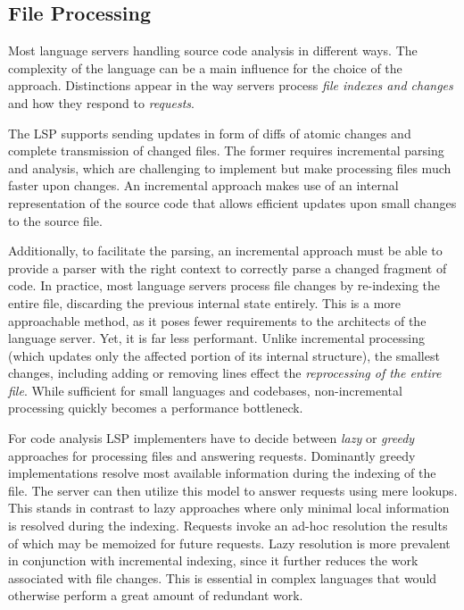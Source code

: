 \documentclass[
  a4paper,
  bibtex,
  english,
  nomenclature]{kthlatex/kththesis/kththesis}
\begin{document}
\hypertarget{sec:file-processing}{%
\subsection{File Processing}\label{sec:file-processing}}

Most language servers handling source code analysis in different ways.
The complexity of the language can be a main influence for the choice of
the approach. Distinctions appear in the way servers process \emph{file
indexes and changes} and how they respond to \emph{requests}.

The LSP supports sending updates in form of diffs of atomic changes and
complete transmission of changed files. The former requires incremental
parsing and analysis, which are challenging to implement but make
processing files much faster upon changes. An incremental approach makes
use of an internal representation of the source code that allows
efficient updates upon small changes to the source file.

Additionally, to facilitate the parsing, an incremental approach must be
able to provide a parser with the right context to correctly parse a
changed fragment of code. In practice, most language servers process
file changes by re-indexing the entire file, discarding the previous
internal state entirely. This is a more approachable method, as it poses
fewer requirements to the architects of the language server. Yet, it is
far less performant. Unlike incremental processing (which updates only
the affected portion of its internal structure), the smallest changes,
including adding or removing lines effect the \emph{reprocessing of the
entire file}. While sufficient for small languages and codebases,
non-incremental processing quickly becomes a performance bottleneck.

For code analysis LSP implementers have to decide between \emph{lazy} or
\emph{greedy} approaches for processing files and answering requests.
Dominantly greedy implementations resolve most available information
during the indexing of the file. The server can then utilize this model
to answer requests using mere lookups. This stands in contrast to lazy
approaches where only minimal local information is resolved during the
indexing. Requests invoke an ad-hoc resolution the results of which may
be memoized for future requests. Lazy resolution is more prevalent in
conjunction with incremental indexing, since it further reduces the work
associated with file changes. This is essential in complex languages
that would otherwise perform a great amount of redundant work.
\end{document}

